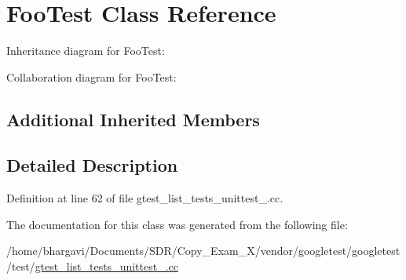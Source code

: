 \hypertarget{class_foo_test}{}\section{Foo\+Test Class Reference}
\label{class_foo_test}


Inheritance diagram for Foo\+Test\+:


Collaboration diagram for Foo\+Test\+:
\subsection*{Additional Inherited Members}


\subsection{Detailed Description}


Definition at line 62 of file gtest\+\_\+list\+\_\+tests\+\_\+unittest\+\_\+.\+cc.



The documentation for this class was generated from the following file\+:\begin{DoxyCompactItemize}
\item 
/home/bhargavi/\+Documents/\+S\+D\+R/\+Copy\+\_\+\+Exam\+\_\+X/vendor/googletest/googletest/test/\hyperlink{gtest__list__tests__unittest___8cc}{gtest\+\_\+list\+\_\+tests\+\_\+unittest\+\_\+.\+cc}\end{DoxyCompactItemize}
